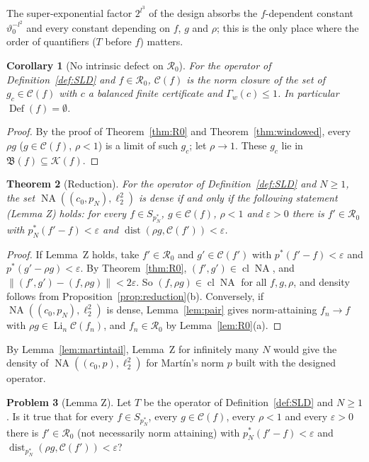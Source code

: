\documentclass[10pt]{amsart}
\newtheorem{theorem}{Theorem}[section]
\newtheorem{corollary}[theorem]{Corollary}
\theoremstyle{definition}
\newtheorem{problem}[theorem]{Problem}
\theoremstyle{remark}
\newcommand{\NA}{\operatorname{NA}}
\newcommand{\dist}{\operatorname{dist}}
\newcommand{\Cset}{\mathcal C}
\newcommand{\Li}{\operatorname*{Li}}
\newcommand{\cl}{\operatorname{cl}}
\newcommand{\Def}{\operatorname{Def}}
\begin{document}
The super-exponential factor $2^{l^3}$ of the design absorbs the
$f$-dependent constant $\vartheta_0^{-l^2}$ and every constant depending on
$f$, $g$ and $\rho$; this is the only place where the order of quantifiers
($T$ before $f$) matters.

\begin{corollary}[No intrinsic defect on $\mathcal R_0$]\label{cor:nodefectR0}
For the operator of Definition~\ref{def:SLD} and $f\in\mathcal R_0$,
$\Cset(f)$ is the norm closure of the set of $g_c\in\Cset(f)$ with $c$ a
balanced finite certificate and $\Gamma_w(c)\le1$.  In particular
$\Def(f)=\emptyset$.
\end{corollary}

\begin{proof}
By the proof of Theorem~\ref{thm:R0} and Theorem~\ref{thm:windowed}, every
$\rho g$ ($g\in\Cset(f)$, $\rho<1$) is a limit of such $g_c$; let
$\rho\to1$.  These $g_c$ lie in $\mathfrak B(f)\subseteq\mathcal K(f)$.
\end{proof}

\begin{theorem}[Reduction]\label{thm:reductionZ}
For the operator of Definition~\ref{def:SLD} and $N\ge1$, the set
$\NA((c_0,p_N),\ell_2^2)$ is dense if and only if the following statement
\textup{(Lemma Z)} holds: for every $f\in S_{p_N^*}$, $g\in\Cset(f)$,
$\rho<1$ and $\varepsilon>0$ there is $f'\in\mathcal R_0$ with
$p_N^*(f'-f)<\varepsilon$ and $\dist(\rho g,\Cset(f'))<\varepsilon$.
\end{theorem}

\begin{proof}
If Lemma~Z holds, take $f'\in\mathcal R_0$ and $g'\in\Cset(f')$ with
$p^*(f'-f)<\varepsilon$ and $p^*(g'-\rho g)<\varepsilon$.  By
Theorem~\ref{thm:R0}, $(f',g')\in\cl\NA$, and $\|(f',g')-(f,\rho g)\|<
2\varepsilon$.  So $(f,\rho g)\in\cl\NA$ for all $f,g,\rho$, and density
follows from Proposition~\ref{prop:reduction}(b).  Conversely, if
$\NA((c_0,p_N),\ell_2^2)$ is dense, Lemma~\ref{lem:pair} gives
norm-attaining $f_n\to f$ with $\rho g\in\Li_n\Cset(f_n)$, and
$f_n\in\mathcal R_0$ by Lemma~\ref{lem:R0}(a).
\end{proof}

By Lemma~\ref{lem:martintail}, Lemma~Z for infinitely many $N$ would give
the density of $\NA((c_0,p),\ell_2^2)$ for Mart\'in's norm $p$ built with
the designed operator.

\begin{problem}[Lemma Z]\label{prob:lemmaZ}
Let $T$ be the operator of Definition~\ref{def:SLD} and $N\ge1$.  Is it true
that for every $f\in S_{p_N^*}$, every $g\in\Cset(f)$, every $\rho<1$ and
every $\varepsilon>0$ there is $f'\in\mathcal R_0$ \textup{(}not necessarily
norm attaining\textup{)} with $p_N^*(f'-f)<\varepsilon$ and
$\dist_{p_N^*}(\rho g,\Cset(f'))<\varepsilon$?
\end{problem}
\end{document}
